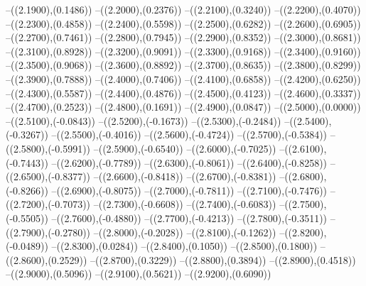 {	--({\sx*(2.1900)},{\sy*(0.1486)})
	--({\sx*(2.2000)},{\sy*(0.2376)})
	--({\sx*(2.2100)},{\sy*(0.3240)})
	--({\sx*(2.2200)},{\sy*(0.4070)})
	--({\sx*(2.2300)},{\sy*(0.4858)})
	--({\sx*(2.2400)},{\sy*(0.5598)})
	--({\sx*(2.2500)},{\sy*(0.6282)})
	--({\sx*(2.2600)},{\sy*(0.6905)})
	--({\sx*(2.2700)},{\sy*(0.7461)})
	--({\sx*(2.2800)},{\sy*(0.7945)})
	--({\sx*(2.2900)},{\sy*(0.8352)})
	--({\sx*(2.3000)},{\sy*(0.8681)})
	--({\sx*(2.3100)},{\sy*(0.8928)})
	--({\sx*(2.3200)},{\sy*(0.9091)})
	--({\sx*(2.3300)},{\sy*(0.9168)})
	--({\sx*(2.3400)},{\sy*(0.9160)})
	--({\sx*(2.3500)},{\sy*(0.9068)})
	--({\sx*(2.3600)},{\sy*(0.8892)})
	--({\sx*(2.3700)},{\sy*(0.8635)})
	--({\sx*(2.3800)},{\sy*(0.8299)})
	--({\sx*(2.3900)},{\sy*(0.7888)})
	--({\sx*(2.4000)},{\sy*(0.7406)})
	--({\sx*(2.4100)},{\sy*(0.6858)})
	--({\sx*(2.4200)},{\sy*(0.6250)})
	--({\sx*(2.4300)},{\sy*(0.5587)})
	--({\sx*(2.4400)},{\sy*(0.4876)})
	--({\sx*(2.4500)},{\sy*(0.4123)})
	--({\sx*(2.4600)},{\sy*(0.3337)})
	--({\sx*(2.4700)},{\sy*(0.2523)})
	--({\sx*(2.4800)},{\sy*(0.1691)})
	--({\sx*(2.4900)},{\sy*(0.0847)})
	--({\sx*(2.5000)},{\sy*(0.0000)})
	--({\sx*(2.5100)},{\sy*(-0.0843)})
	--({\sx*(2.5200)},{\sy*(-0.1673)})
	--({\sx*(2.5300)},{\sy*(-0.2484)})
	--({\sx*(2.5400)},{\sy*(-0.3267)})
	--({\sx*(2.5500)},{\sy*(-0.4016)})
	--({\sx*(2.5600)},{\sy*(-0.4724)})
	--({\sx*(2.5700)},{\sy*(-0.5384)})
	--({\sx*(2.5800)},{\sy*(-0.5991)})
	--({\sx*(2.5900)},{\sy*(-0.6540)})
	--({\sx*(2.6000)},{\sy*(-0.7025)})
	--({\sx*(2.6100)},{\sy*(-0.7443)})
	--({\sx*(2.6200)},{\sy*(-0.7789)})
	--({\sx*(2.6300)},{\sy*(-0.8061)})
	--({\sx*(2.6400)},{\sy*(-0.8258)})
	--({\sx*(2.6500)},{\sy*(-0.8377)})
	--({\sx*(2.6600)},{\sy*(-0.8418)})
	--({\sx*(2.6700)},{\sy*(-0.8381)})
	--({\sx*(2.6800)},{\sy*(-0.8266)})
	--({\sx*(2.6900)},{\sy*(-0.8075)})
	--({\sx*(2.7000)},{\sy*(-0.7811)})
	--({\sx*(2.7100)},{\sy*(-0.7476)})
	--({\sx*(2.7200)},{\sy*(-0.7073)})
	--({\sx*(2.7300)},{\sy*(-0.6608)})
	--({\sx*(2.7400)},{\sy*(-0.6083)})
	--({\sx*(2.7500)},{\sy*(-0.5505)})
	--({\sx*(2.7600)},{\sy*(-0.4880)})
	--({\sx*(2.7700)},{\sy*(-0.4213)})
	--({\sx*(2.7800)},{\sy*(-0.3511)})
	--({\sx*(2.7900)},{\sy*(-0.2780)})
	--({\sx*(2.8000)},{\sy*(-0.2028)})
	--({\sx*(2.8100)},{\sy*(-0.1262)})
	--({\sx*(2.8200)},{\sy*(-0.0489)})
	--({\sx*(2.8300)},{\sy*(0.0284)})
	--({\sx*(2.8400)},{\sy*(0.1050)})
	--({\sx*(2.8500)},{\sy*(0.1800)})
	--({\sx*(2.8600)},{\sy*(0.2529)})
	--({\sx*(2.8700)},{\sy*(0.3229)})
	--({\sx*(2.8800)},{\sy*(0.3894)})
	--({\sx*(2.8900)},{\sy*(0.4518)})
	--({\sx*(2.9000)},{\sy*(0.5096)})
	--({\sx*(2.9100)},{\sy*(0.5621)})
	--({\sx*(2.9200)},{\sy*(0.6090)})
}
